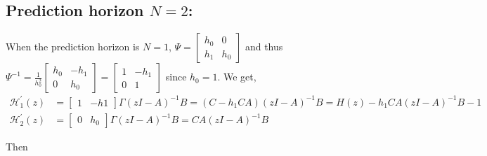 \documentclass[a4paper]{article}
\begin{document}
\subsection{Prediction horizon $N=2$:}
When the prediction horizon is $N = 1$, $\Psi = \begin{bmatrix}
h_{0} & 0 \\ h_{1} & h_{0}
\end{bmatrix}$ and thus  $\Psi^{-1} = \frac{1}{h_{0}^{2}} \begin{bmatrix} h_{0} & - h_{1} \\ 0 & h_{0} \end{bmatrix}  = \begin{bmatrix} 1 & - h_{1} \\ 0 & 1 \end{bmatrix}$ since $h_{0} = 1$. We get, 
\begin{align*}
	\mathcal{H}_{1}^{\prime}(z) &=  \begin{bmatrix}
		1 & -h1
	\end{bmatrix} \Gamma(zI- A)^{-1}B = (C - h_{1}CA) (zI- A)^{-1}B =H(z)  - h_{1}CA(zI- A)^{-1}B -1 \\
	\mathcal{H}_{2}^{\prime}(z) &=  \begin{bmatrix}
		0 & h_{0}
	\end{bmatrix} \Gamma(zI- A)^{-1}B = CA(zI- A)^{-1}B
\end{align*}


Then
\end{document}
